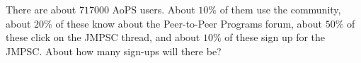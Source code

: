 There are about $717000$ AoPS users. About $10\%$ of them use the community, about $20\%$ of these know about the Peer-to-Peer Programs forum, about $50\%$ of these click on the JMPSC thread, and about $10\%$ of these sign up for the JMPSC. About how many sign-ups will there be?
